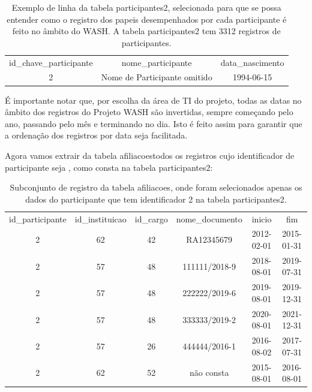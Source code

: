 \documentclass[
12pt,		%
openright,	%
twoside,  %
a4paper,			%
chapter=TITLE,		%
english,			%
french,				%
spanish,			%
brazil				%
]{USPSC-classe/USPSC_RedarTex}
\begin{document}
\begin{table}[Htb]
\tiny
\caption{\label{da795407f30b81295f1892e346a5056ebb3ad5cc}Exemplo de linha da tabela participantes2, selecionada para que se possa entender como o registro dos papeis desempenhados por cada participante \'e feito no \^ambito do WASH. A tabela participantes2 tem 3312 registros de participantes.}

\centering
\begin{tabular}{|c|c|c|}
\hline
id\_chave\_participante  &  nome\_participante             &  data\_nascimento  \\
                     2  &  Nome de Participante omitido  &  1994-06-15 \\
\hline
\end{tabular}
\end{table}


\'E importante notar que, por escolha da \'area de TI do projeto, todas as datas no \^ambito dos registros do Projeto WASH s\~ao invertidas, sempre come\c{c}ando pelo ano, passando pelo m\^es e terminando no dia. Isto \'e feito assim para garantir que a ordena\c{c}\~ao dos registros por data seja facilitada.








Agora vamos extrair da tabela \textquotedbl afiliacoes\textquotedbl  todos os registros cujo identificador de participante seja \textquotedbl , como consta na tabela participantes2:












\begin{table}[Htb]
\tiny
\caption{\label{888dcbd207ec3c4145a4093c14afbbe128bf67af}Subconjunto de registro da tabela afiliacoes, onde foram selecionados apenas os dados do participante que tem identificador 2 na tabela participantes2.}

\centering
\begin{tabular}{|c|c|c|c|c|c|}
\hline
id\_participante  &  id\_instituicao  &  id\_cargo  &  nome\_documento  &  inicio      &  fim \\
              2  &              62  &        42  &  RA12345679      &  2012-02-01  &  2015-01-31  \\
              2  &              57  &        48  &  111111/2018-9   &  2018-08-01  &  2019-07-31  \\
              2  &              57  &        48  &  222222/2019-6   &  2019-08-01  &  2019-12-31  \\
              2  &              57  &        48  &  333333/2019-2   &  2020-08-01  &  2021-12-31  \\
              2  &              57  &        26  &  444444/2016-1   &  2016-08-02  &  2017-07-31  \\
              2  &              62  &        52  &  n\~ao consta      &  2015-08-01  &  2016-08-01 \\
\hline
\end{tabular}
\end{table}
\end{document}

